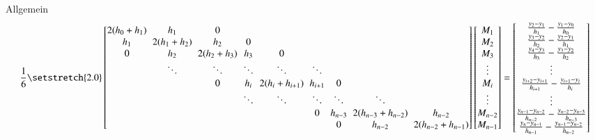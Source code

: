 \documentclass[10pt,a4paper]{article}
\begin{document}
		Allgemein
		\begin{align*}
		\frac{1}{6} 
		\begingroup %
		\setlength\arraycolsep{3pt}
		\setstretch{2.0}
		\begin{bmatrix}
			2(h_0+h_1) & h_1        & 0          &        &                &         &         &                    &  \\
			h_1        & 2(h_1+h_2) & h_2        & 0      &                &         &         &                    &  \\
			0          & h_2        & 2(h_2+h_3) & h_3    & 0              &         &         &                    &  \\
			           & \ddots     & \ddots     & \ddots & \ddots         & \ddots  &         &                    &  \\
			           &            & 0          & h_i    & 2(h_i+h_{i+1}) & h_{i+1} & 0       &                    &  \\
			           &            &            & \ddots & \ddots         & \ddots  & \ddots  & \ddots             &  \\
			           &            &            &        &                & 0       & h_{n-3} & 2(h_{n-3}+h_{n-2}) & h_{n-2}            \\
			           &            &            &        &                &         & 0       & h_{n-2}            & 2(h_{n-2}+h_{n-1})
		\end{bmatrix}
		\endgroup
		\begin{bmatrix}
			M_1     \\
			M_2     \\
			M_3     \\
			\vdots  \\
			M_i     \\
			\vdots  \\
			M_{n-2} \\
			M_{n-1}
		\end{bmatrix}
		=
		\begin{bmatrix}
			\frac{y_{2}-y_{1}}{h_{1}}-\frac{y_{1}-y_{0}}{h_0}               \\
			\frac{y_{3}-y_{2}}{h_{2}}-\frac{y_{2}-y_{1}}{h_1}               \\
			\frac{y_{4}-y_{3}}{h_{3}}-\frac{y_{3}-y_{2}}{h_2}               \\
			\vdots                                                          \\
			\frac{y_{i+2}-y_{i+1}}{h_{i+1}}-\frac{y_{i+1}-y_i}{h_i}         \\
			\vdots                                                          \\
			\frac{y_{n-1}-y_{n-2}}{h_{n-2}}-\frac{y_{n-2}-y_{n-3}}{h_{n-3}} \\
			\frac{y_{n}-y_{n-1}}{h_{n-1}}-\frac{y_{n-1}-y_{n-2}}{h_{n-2}}
		\end{bmatrix}
		\end{align*}	
\end{document}
